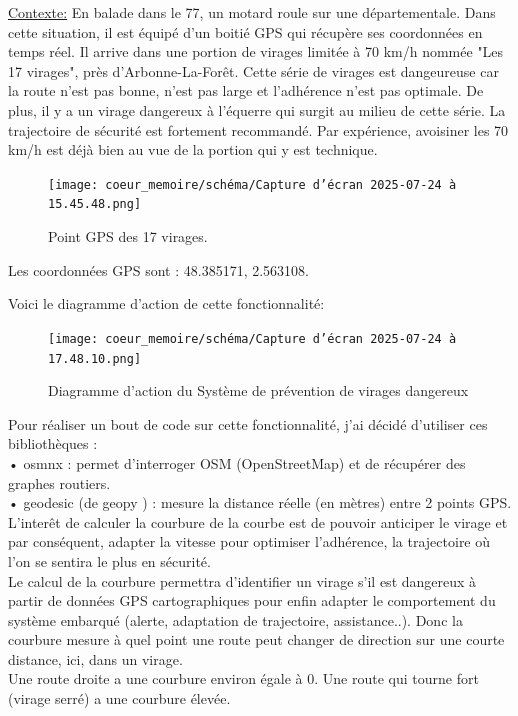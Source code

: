 \underline{Contexte:} En balade dans le 77, un motard roule sur une départementale. Dans cette situation, il est équipé d'un boitié GPS qui récupère ses coordonnées en temps réel. Il arrive dans une portion de virages limitée à 70 km/h nommée "Les 17 virages", près d'Arbonne-La-Forêt. Cette série de virages est dangeureuse car la route n'est pas bonne, n'est pas large et l'adhérence n'est pas optimale. De plus, il y a un virage dangereux à l'équerre qui surgit au milieu de cette série. La trajectoire de sécurité est fortement recommandé. Par expérience, avoisiner les 70 km/h est déjà bien au vue de la portion qui y est technique.

\begin{figure}[H]
    \centering
    \texttt{[image: coeur\_memoire/schéma/Capture d’écran 2025-07-24 à 15.45.48.png]} 
    \caption{Point GPS des 17 virages.}
\end{figure}




Les coordonnées GPS sont : 48.385171, 2.563108.

Voici le diagramme d'action de cette fonctionnalité:\\

\begin{figure}[H]
    \centering
    \texttt{[image: coeur\_memoire/schéma/Capture d’écran 2025-07-24 à 17.48.10.png]} 
    \caption{Diagramme d'action du Système de prévention de virages dangereux}
\end{figure}

Pour réaliser un bout de code sur cette fonctionnalité, j'ai décidé d'utiliser ces bibliothèques :\\
• osmnx\cite{osm_doc} : permet d’interroger OSM (OpenStreetMap) et de récupérer des graphes routiers.\\
•	geodesic (de geopy \cite{geopy}) : mesure la distance réelle (en mètres) entre 2 points GPS.\\

L'interêt de calculer la courbure de la courbe est de pouvoir anticiper le virage et par conséquent, adapter la vitesse pour optimiser l'adhérence, la trajectoire où l'on se sentira le plus en sécurité. \\
Le calcul de la courbure permettra d'identifier un virage s'il est dangereux à partir de données GPS cartographiques pour enfin adapter le comportement du système embarqué (alerte, adaptation de trajectoire, assistance..).
Donc la courbure mesure à quel point une route peut changer de direction sur une courte distance, ici, dans un virage.\\
Une route droite a une courbure environ égale à 0. Une route qui tourne fort (virage serré) a une courbure élevée.

